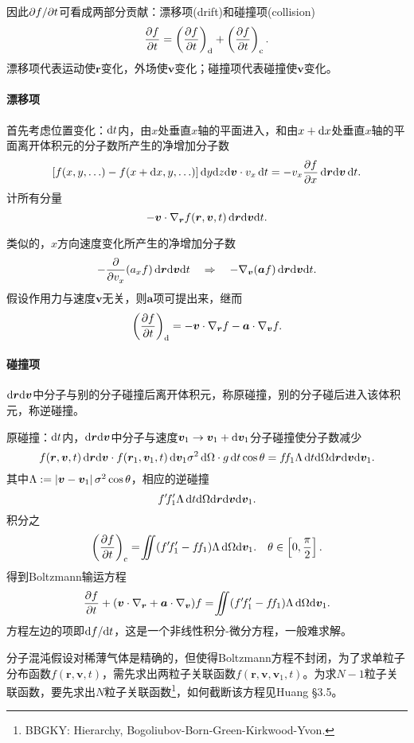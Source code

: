 因此$\partial f/\partial t$可看成两部分贡献：漂移项(drift)和碰撞项(collision)
\begin{align}
	\pv ft=\kh{\pv ft}_\df+\kh{\pv ft}_\cll.
\end{align}
漂移项代表运动使$\bm r$变化，外场使$\bm v$变化；碰撞项代表碰撞使$\bm v$变化。
\paragraph*{漂移项}首先考虑位置变化：$\mathop{}\!\mathrm{d} t$内，由$x$处垂直$x$轴的平面进入，和由$x+\mathop{}\!\mathrm{d} x$处垂直$x$轴的平面离开体积元的分子数所产生的净增加分子数
\[
	\fkh{f(x,y,\ldots)-f(x+\d x,y,\ldots)}\d y\nd z\nd\bm v\cdot v_x\d t=-v_x\pv fx\d\bm r\nd\bm v\d t.
\]
计所有分量
\[
	-\bm v\cdot\nabla_{\bm r}f(\bm r,\bm v,t)\mathop{}\!\mathrm{d}\bm r\mathrm{d}\bm v\mathrm{d} t.
\]

类似的，$x$方向速度变化所产生的净增加分子数
\[
	-\frac{\partial^{\;\!\!}}{\partial v_x^{\;\!\!}}(a_xf)\mathop{}\!\mathrm{d}\bm r\mathrm{d}\bm v\mathrm{d} t\quad\Rightarrow\quad-\nabla_{\bm v}(\bm af)\mathop{}\!\mathrm{d}\bm r\mathrm{d}\bm v\mathrm{d} t.
\]
假设作用力与速度$\bm v$无关，则$\bm a$项可提出来，继而
\begin{align}
	\left(\frac{\partial^{\;\!\!}f}{\partial t^{\;\!\!}}\right)_\mathrm d=-\bm v\cdot\nabla_{\bm r}f-\bm a\cdot\nabla_{\bm v}f.
\end{align}
\paragraph*{碰撞项}$\mathop{}\!\mathrm{d}\bm r\mathrm{d}\bm v$中分子与别的分子碰撞后离开体积元，称原碰撞，别的分子碰后进入该体积元，称逆碰撞。

原碰撞：$\mathop{}\!\mathrm{d} t$内，$\mathop{}\!\mathrm{d}\bm r\mathrm{d}\bm v$中分子与速度$\bm v_1\to\bm v_1+\mathop{}\!\mathrm{d}\bm v_1$分子碰撞使分子数减少
\[
	f(\bm r,\bm v,t)\mathop{}\!\mathrm{d}\bm r\mathrm{d}\bm v\cdot f(\bm r_1,\bm v_1,t)\mathop{}\!\mathrm{d}\bm v_1\sigma^2\mathop{}\!\mathrm{d}\Omega\cdot g\mathop{}\!\mathrm{d} t\cos\theta=f\!f_1\Lambda\mathop{}\!\mathrm{d} t\mathrm{d}\Omega\mathrm{d}\bm r\mathrm{d}\bm v\mathrm{d}\bm v_1.
\]
其中$\Lambda:=\left\lvert\bm v-\bm v_1\right\rvert\sigma^2\cos\theta$，相应的逆碰撞
\[
	f'\!f_1'\Lambda\mathop{}\!\mathrm{d} t\mathrm{d}\Omega\mathrm{d}\bm r\mathrm{d}\bm v\mathrm{d}\bm v_1.
\]
积分之
\begin{align}
	\kh{\pv ft}_\cll=\intt(f'\!f_1'-f\!f_1)\Lambda\d\Omega\nd\bm v_1.\quad\theta\in\fkh{0,\frac\pi{2}}.
\end{align}
得到Boltzmann输运方程
\begin{align}
	\pv ft+(\bm v\cdot\nabla_{\bm r}+\bm a\cdot\nabla_{\bm v})f=\intt(f'\!f_1'-f\!f_1)\Lambda\d\Omega\nd\bm v_1.
\end{align}
方程左边的项即$\mathop{}\!\mathrm{d} f/\mathrm{d} t$，这是一个非线性积分-微分方程，一般难求解。

分子混沌假设对稀薄气体是精确的，但使得Boltzmann方程不封闭，为了求单粒子分布函数$f(\bm r,\bm v,t)$，需先求出两粒子关联函数$f(\bm r,\bm v,\bm v_1,t)$。为求$N-1$粒子关联函数，要先求出$N$粒子关联函数\footnote{BBGKY: Hierarchy, Bogoliubov-Born-Green-Kirkwood-Yvon.}，如何截断该方程见Huang \S 3.5。
